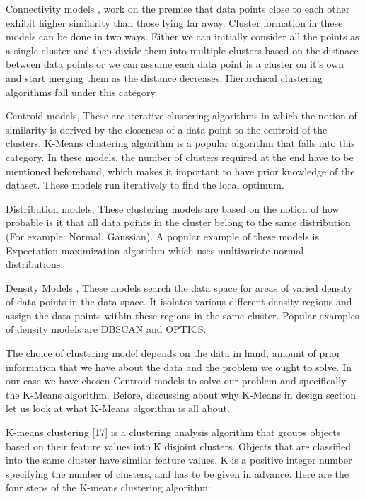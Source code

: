 Connectivity models \cite{doi:10.1093/comjnl/26.4.354}, work on the premise that data points close to each other exhibit higher similarity than those lying far away. Cluster formation in these models can be done in two ways. Either we can initially consider all the points as a single cluster and then divide them into multiple clusters based on the distnace between data points or we can assume each data point is a cluster on it's own and start merging them as the distance decreases. Hierarchical clustering algorithms fall under this category.

Centroid models, These are iterative clustering algorithms in which the notion of similarity is derived by the closeness of a data point to the centroid of the clusters. K-Means clustering algorithm \cite{Derpanis06k-meansclustering} is a popular algorithm that falls into this category. In these models, the number of clusters required at the end have to be mentioned beforehand, which makes it important to have prior knowledge of the dataset. These models run iteratively to find the local optimum.



Distribution models\cite{Johnson2000}, These clustering models are based on the notion of how probable is it that all data points in the cluster belong to the same distribution (For example: Normal, Gaussian). A popular example of these models is Expectation-maximization algorithm which uses multivariate normal distributions.

Density Models \cite{thang2011anomaly}, These models search the data space for areas of varied density of data points in the data space. It isolates various different density regions and assign the data points within these regions in the same cluster. Popular examples of density models are DBSCAN and OPTICS.

The choice of clustering model depends on the data in hand, amount of prior information that we have about the data and the problem we ought to solve. In our case we have chosen Centroid models to solve our problem and specifically the K-Means algorithm. Before, discussing about why K-Means in design section let us look at what K-Means algorithm is all about.

K-means clustering [17] is a clustering analysis algorithm that groups objects based on their feature values into K disjoint clusters. Objects that are classified into the same cluster have similar feature values. K is a positive integer number specifying the number of clusters, and has to be given in advance. Here are the four steps of the K-means clustering
algorithm:

